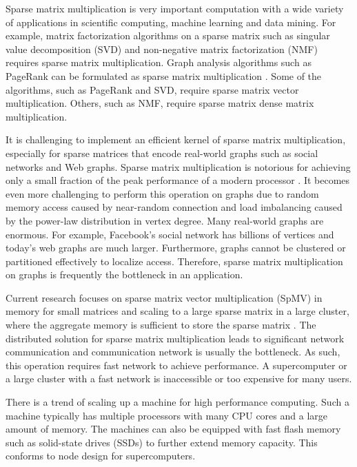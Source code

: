 Sparse matrix multiplication is very important computation with a wide variety
of applications in scientific computing, machine learning and data mining.
For example, matrix factorization algorithms on a sparse matrix such as
singular value decomposition (SVD) \cite{svd} and non-negative matrix
factorization (NMF) \cite{nmf} requires sparse matrix multiplication.
Graph analysis algorithms such as PageRank \cite{pagerank} can be
formulated as sparse matrix multiplication \cite{Mattson13}. Some of
the algorithms, such as PageRank and SVD, require sparse matrix vector
multiplication. Others, such as NMF, require sparse matrix dense
matrix multiplication.


It is challenging to implement an efficient kernel of sparse matrix
multiplication, especially for sparse matrices that encode real-world graphs
such as social networks
and Web graphs. Sparse matrix multiplication is notorious for achieving only
a small fraction of the peak performance of a modern processor \cite{Williams07}.
It becomes even more challenging to perform this operation on graphs due to
random memory access caused by near-random connection and load imbalancing
caused by the power-law distribution in vertex degree. Many real-world graphs
are enormous. For example, Facebook's social network has billions of vertices
and today's web graphs are much larger. Furthermore, graphs cannot be
clustered or partitioned effectively \cite{leskovec} to localize access.
Therefore, sparse matrix multiplication on graphs is frequently the bottleneck
in an application.

Current research focuses on sparse matrix vector multiplication (SpMV) in memory
for small matrices and scaling to a large sparse matrix in a large cluster,
where the aggregate memory is sufficient to store the sparse matrix
\cite{Williams07, Yoo11, Boman2013}.
The distributed solution for sparse matrix multiplication leads to significant
network communication and communication network is usually the bottleneck.
As such, this operation requires fast network to achieve performance.
A supercomputer or a large cluster with a fast network is inaccessible or
too expensive for many users.



There is a trend of scaling up a machine for high performance computing.
Such a machine typically has multiple processors with many CPU cores and
a large amount of memory. The machines can also be equipped with fast flash
memory such as solid-state drives (SSDs) to further extend memory capacity.
This conforms to node design for supercomputers.

